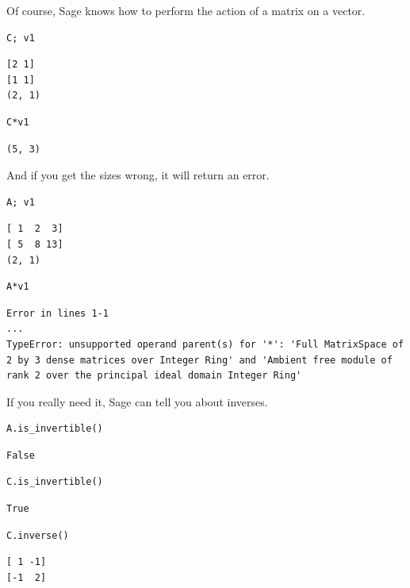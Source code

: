 \documentclass[10pt,]{book}
\theoremstyle{plain}
\theoremstyle{definition}
\numberwithin{equation}{section}
\begin{document}
        Of course, Sage knows how to perform the action of a matrix on a vector.
\begin{lstlisting}[style=sageinput]
C; v1
\end{lstlisting}
\begin{lstlisting}[style=sageoutput]
[2 1]
[1 1]
(2, 1)
\end{lstlisting}
\begin{lstlisting}[style=sageinput]
C*v1
\end{lstlisting}
\begin{lstlisting}[style=sageoutput]
(5, 3)
\end{lstlisting}
\par
And if you get the sizes wrong, it will return an error.%
\begin{lstlisting}[style=sageinput]
A; v1
\end{lstlisting}
\begin{lstlisting}[style=sageoutput]
[ 1  2  3]
[ 5  8 13]
(2, 1)
\end{lstlisting}
\begin{lstlisting}[style=sageinput]
A*v1
\end{lstlisting}
\begin{lstlisting}[style=sageoutput]
Error in lines 1-1
...
TypeError: unsupported operand parent(s) for '*': 'Full MatrixSpace of 2 by 3 dense matrices over Integer Ring' and 'Ambient free module of rank 2 over the principal ideal domain Integer Ring'
\end{lstlisting}
\par
If you really need it, Sage can tell you about inverses.%
\begin{lstlisting}[style=sageinput]
A.is_invertible()
\end{lstlisting}
\begin{lstlisting}[style=sageoutput]
False
\end{lstlisting}
\begin{lstlisting}[style=sageinput]
C.is_invertible()
\end{lstlisting}
\begin{lstlisting}[style=sageoutput]
True
\end{lstlisting}
\begin{lstlisting}[style=sageinput]
C.inverse()
\end{lstlisting}
\begin{lstlisting}[style=sageoutput]
[ 1 -1]
[-1  2]
\end{lstlisting}
\typeout{************************************************}
\typeout{************************************************}
\end{document}
